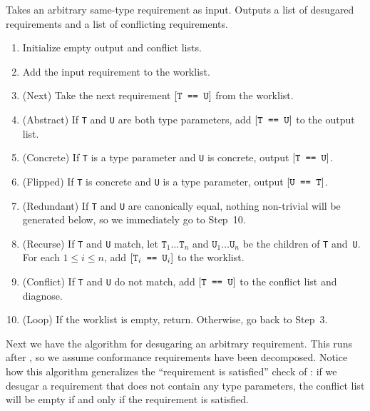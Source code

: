 \documentclass[../generics]{subfiles}
\begin{document}
\begin{algorithm}\label{desugar same type algo} Takes an arbitrary same-type requirement as input. Outputs a list of desugared requirements and a list of conflicting requirements.
\begin{enumerate}
\item Initialize empty output and conflict lists.
\item Add the input requirement to the worklist.
\item (Next) Take the next requirement $[\texttt{T == U}]$ from the worklist.
\item (Abstract) If \texttt{T} and \texttt{U} are both type parameters, add $[\texttt{T == U}]$ to the output list.
\item (Concrete) If \texttt{T} is a type parameter and \texttt{U} is concrete, output $[\texttt{T == U}]$.
\item (Flipped) If \texttt{T} is concrete and \texttt{U} is a type parameter, output $[\texttt{U == T}]$.
\item (Redundant) If \texttt{T} and \texttt{U} are canonically equal, nothing non-trivial will be generated below, so we immediately go to Step~10.
\item (Recurse) If \texttt{T} and \texttt{U} match, let $\texttt{T}_1\ldots\texttt{T}_n$ and $\texttt{U}_1\ldots\texttt{U}_n$ be the children of \texttt{T} and~\texttt{U}. For each $1\le i\le n$, add $[\texttt{$\texttt{T}_i$ == $\texttt{U}_i$}]$ to the worklist.
\item (Conflict) If \texttt{T} and \texttt{U} do not match, add $[\texttt{T == U}]$ to the conflict list and diagnose.
\item (Loop) If the worklist is empty, return. Otherwise, go back to Step~3.
\end{enumerate}
\end{algorithm}
Next we have the algorithm for desugaring an arbitrary requirement. This runs after , so we assume conformance requirements have been decomposed. Notice how this algorithm generalizes the ``requirement is satisfied'' check of : if we desugar a requirement that does not contain any type parameters, the conflict list will be empty if and only if the requirement is satisfied.
\end{document}

